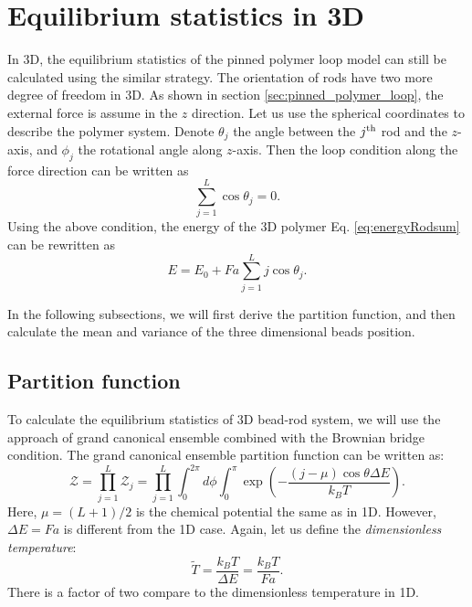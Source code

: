 \section{Equilibrium statistics in 3D}
\label{sec:equilibrium_statistics_in_3d}
In 3D, the equilibrium statistics of the pinned polymer loop model can still be calculated using the similar strategy. The orientation of rods have two more degree of freedom in 3D. As shown in section \ref{sec:pinned_polymer_loop}, the external force is assume in the $z$ direction. Let us use the spherical coordinates to describe the polymer system. Denote $\theta_j$ the angle between the $j^{\rm{th}}$ rod and the $z$-axis, and $\phi_j$ the rotational angle along $z$-axis. Then the loop condition along the force direction can be written as
\begin{equation}
    \label{eq:loopCondition3D}
    \sum_{j=1}^L \cos\theta_j = 0.
\end{equation}
Using the above condition, the energy of the 3D polymer Eq. \eqref{eq:energyRodsum} can be rewritten as 
\begin{equation}
    \label{eq:energy3D}
    E = E_0 + Fa\sum_{j=1}^L j\cos\theta_j.
\end{equation}

In the following subsections, we will first derive the partition function, and then calculate the mean and variance of the three dimensional beads position. 

\subsection{Partition function}
\label{sub:partition_function}
To calculate the equilibrium statistics of 3D bead-rod system, we will use the approach of grand canonical ensemble combined with the Brownian bridge condition. The grand canonical ensemble partition function can be written as:
\begin{equation}
    \label{eq:partitionFunc3D}
    \mathcal{Z} = \prod_{j=1}^L \mathcal{Z}_j = \prod_{j=1}^L \int_{0}^{2\pi} d\phi \int_{0}^{\pi}\exp\left(-\frac{(j-\mu)\cos\theta\Delta E}{k_BT}\right).
\end{equation}
Here, $\mu=(L+1)/2$ is the chemical potential the same as in 1D. However, $\Delta E = Fa$ is different from the 1D case. Again, let us define the \emph{dimensionless temperature}:
\begin{equation}
    \tilde{T} = \frac{k_B T}{\Delta E} = \frac{k_B T}{Fa}.
\end{equation}
There is a factor of two compare to the dimensionless temperature in 1D.

